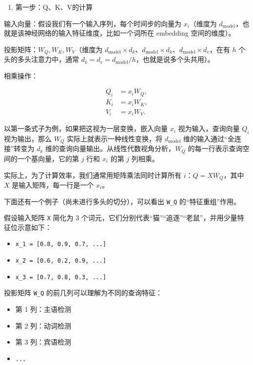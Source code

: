 \begin{enumerate}
\def\labelenumi{\arabic{enumi}.}
\tightlist
\item
  第一步：Q、K、V的计算
\end{enumerate}

输入向量：假设我们有一个输入序列，每个时间步的向量为 \(x_i\)（维度为 \(d_{\mathrm{model}}\)，也就是该神经网络的输入特征维度，比如一个词所在 embedding 空间的维度）。

投影矩阵：\(W_Q,W_K,W_V\)（维度为 \(d_{\mathrm{model}}\times d_k\)、\(d_{\mathrm{model}}\times d_k\)、\(d_{\mathrm{model}}\times d_v\)，在有 \(h\) 个头的多头注意力中，通常 \(d_k=d_v=d_{\mathrm{model}}/h\)，也就是说多个头共用）。

相乘操作：

\[
\begin{aligned}
Q_i &= x_i W_Q,\\
K_i &= x_i W_K,\\
V_i &= x_i W_V.
\end{aligned}
\]

以第一条式子为例，如果把这视为一层变换，嵌入向量 \(x_i\) 视为输入，查询向量 \(Q_i\) 视为输出，那么 \(W_Q\) 实际上就表示一种线性变换，将 \(d_{\mathrm{model}}\) 维的输入通过``全连接''转变为 \(d_k\) 维的查询向量输出。从线性代数视角分析，\(W_Q\) 的每一行表示查询空间的一个基向量，它的第 \(j\) 行和 \(x_i\) 的第 \(j\) 列相乘。

实际上，为了计算效率，我们通常用矩阵乘法同时计算所有 \(i\)：\(Q=XW_Q\)，其中 \(X\) 是输入矩阵，每一行是一个 \(x_i\)。

下面还有一个例子（尚未进行多头的切分），可以看出 \texttt{W\_Q} 的``特征重组''作用。

假设输入矩阵 \texttt{X} 简化为 3 个词元，它们分别代表``猫''``追逐''``老鼠''，并用少量特征位示意如下：

\begin{itemize}
\tightlist
\item
  \texttt{x\_1\ =\ {[}0.8,\ 0.9,\ 0.7,\ ...{]}}
\item
  \texttt{x\_2\ =\ {[}0.6,\ 0.2,\ 0.9,\ ...{]}}
\item
  \texttt{x\_3\ =\ {[}0.7,\ 0.8,\ 0.3,\ ...{]}}
\end{itemize}

投影矩阵 \texttt{W\_Q} 的前几列可以理解为不同的查询特征：

\begin{itemize}
\tightlist
\item
  第 1 列：主语检测
\item
  第 2 列：动词检测
\item
  第 3 列：宾语检测
\item
  \texttt{...}
\end{itemize}

